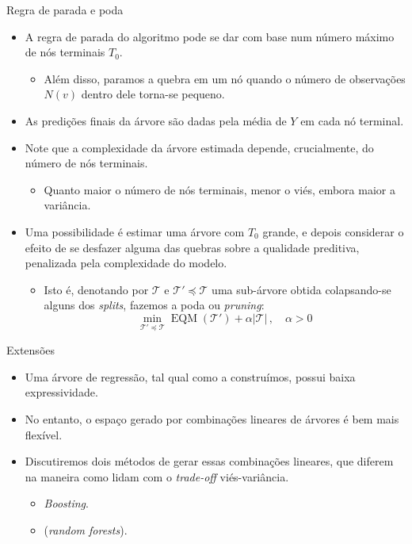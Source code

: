 \documentclass[11pt]{beamer}
\begin{document}
\begin{frame}{Regra de parada e poda}
	\begin{itemize}
		\item A regra de parada do algoritmo pode se dar com base num número máximo de nós terminais $T_0$.
		\begin{itemize}
			\item Além disso, paramos a quebra em um nó quando o número de observações $N(v)$ dentro dele torna-se pequeno.
		\end{itemize}
		\item As predições finais da árvore são dadas pela média de $Y$ em cada nó terminal.
		\item Note que a complexidade da árvore estimada depende, crucialmente, do número de nós terminais.
		\begin{itemize}
			\item Quanto maior o número de nós terminais, menor o viés, embora maior a variância.
		\end{itemize}
		\item Uma possibilidade é estimar uma árvore com $T_0$ grande, e depois considerar o efeito de se desfazer alguma das quebras sobre a qualidade preditiva, {\color{blue}penalizada} pela complexidade do modelo.
		\begin{itemize}
			\item Isto é, denotando por $\mathcal{T}$ e $\mathcal{T}' \preceq \mathcal{T}$ uma sub-árvore obtida colapsando-se  alguns dos \textit{splits}, fazemos a poda ou \textit{pruning}:
			$$\min_{\mathcal{T}' \preceq  \mathcal{T}} \operatorname{EQM}(\mathcal{T}' ) + \alpha |\mathcal{T}|\, ,\quad \alpha > 0$$
		\end{itemize}
		 
	\end{itemize}
\end{frame}


\begin{frame}{Extensões}
	\begin{itemize}
		\item Uma árvore de regressão, tal qual como a construímos, possui baixa expressividade.
		\item No entanto, o espaço gerado por combinações lineares de árvores é bem mais flexível.
		\item Discutiremos dois métodos de gerar essas combinações lineares, que diferem na maneira como lidam com o \textit{trade-off }viés-variância.
		\begin{itemize}
			\item \textit{Boosting}.
			\item {} (\textit{random forests}).
		\end{itemize}
	\end{itemize}
\end{frame}
\end{document}
